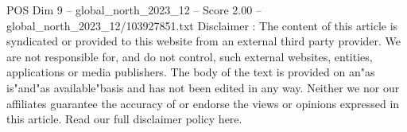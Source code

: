 \begin{textsample}{POS Dim 9 – global\_north\_2023\_12 – Score 2.00 – global\_north\_2023\_12/103927851.txt}
Disclaimer : The content of this article is syndicated or provided to this website from an external third party provider.
We are not responsible for, and do not control, such external websites, entities, applications or media publishers.
The body of the text is provided on an"as is"and"as available"basis and has not been edited in any way.
Neither we nor our affiliates guarantee the accuracy of or endorse the views or opinions expressed in this article.
Read our full disclaimer policy here.

\end{textsample}
